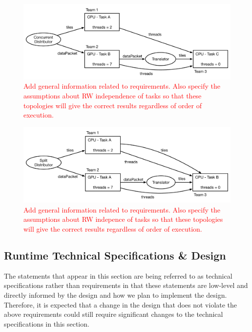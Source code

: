 \documentclass{article}
\begin{document}
\begin{figure}[!ht]
\begin{center}
\includegraphics[width=5.5in]{ConcurrentItorExample.pdf}
\caption[]{\textcolor{red}{Add general information related to requirements.
Also specify the assumptions about RW independence of tasks so that these
topologies will give the correct results regardless of order of execution.}}
\label{fig:ConcurrentItor}
\end{center}
\end{figure}

\begin{figure}[!ht]
\begin{center}
\includegraphics[width=5.5in]{WorkSplittingExample.pdf}
\caption[]{\textcolor{red}{Add general information related to requirements.
Also specify the assumptions about RW indepence of tasks so that these
topologies will give the correct results regardless of order of execution.}}
\label{fig:SplitItor}
\end{center}
\end{figure}

\subsection{Runtime Technical Specifications \& Design}
The statements that appear in this section are being referred to as technical
specifications rather than requirements in that these statements are low-level
and directly informed by the design and how we plan to implement the design.
Therefore, it is expected that a change in the design that does not violate the
above requirements could still require significant changes to the technical
specifications in this section.\\
\end{document}
